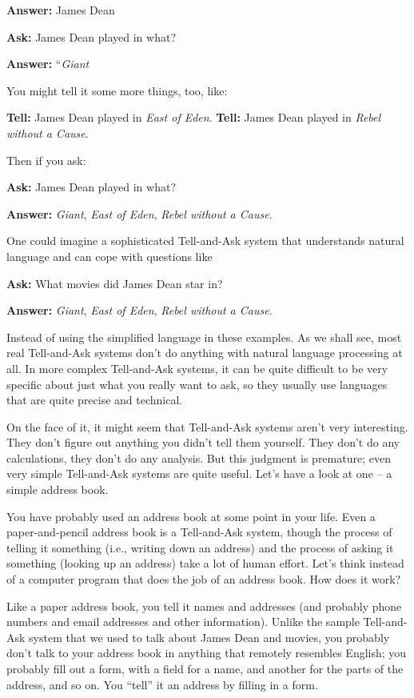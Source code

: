 \textbf{Answer:} James Dean

\textbf{Ask:} James Dean played in what?

\textbf{Answer:} ``\emph{Giant}

You might tell it some more things, too, like:

\textbf{Tell:} James Dean played in \emph{East of Eden}. 
\textbf{Tell:} James Dean played in \emph{Rebel without a Cause}.

Then if you ask:

\textbf{Ask:} James Dean played in what?

\textbf{Answer:} \emph{Giant}, \emph{East of Eden}, \emph{Rebel without a Cause}.

One could imagine a sophisticated Tell-and-Ask system that understands
natural language and can cope with questions like

\textbf{Ask:} What movies did James Dean star in?

\textbf{Answer:} \emph{Giant}, \emph{East of Eden}, \emph{Rebel without a Cause}.

Instead of using the simplified language in these examples. As we shall
see, most real Tell-and-Ask systems don't do anything with natural
language processing at all. In more complex Tell-and-Ask 
systems, it can be quite difficult to be very specific about just what
you really want to ask, so they usually use languages that are quite
precise and technical.

On the face of it, it might seem that Tell-and-Ask systems aren't very
interesting. They don't figure out anything you didn't tell them
yourself. They don't do any calculations, they don't do any analysis.
But this judgment is premature; even very simple Tell-and-Ask systems
are quite useful. Let's have a look at one -- a simple address book.

You have probably used an address book at some point in your life. Even
a paper-and-pencil 
address book is a Tell-and-Ask system, though the process of telling it
something (i.e., writing down an address) and the process of asking it
something (looking up an address) take a lot of human effort. Let's
think instead of a computer program that does the job of an address
book. How does it work?

Like a paper address book, you tell it names and addresses (and probably
phone numbers and email addresses and other information). Unlike the
sample Tell-and-Ask system that we used to talk about James Dean and
movies, you probably don't talk to your address book in anything that
remotely resembles English; you probably fill out a form, with a field
for a name, and another for the parts of the address, and so on. You
``tell'' it an address by filling in a form.

